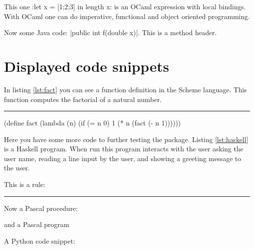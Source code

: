 \documentclass[10pt]{article}
\begin{document}

This one
\pyginline[lang=ocaml,font=\ttfamily\scriptsize,topline=false]:let x = [1;2;3] in length x:
is an OCaml expression with local bindings. With OCaml one can do
imperative, functional and object oriented programming.

Now some Java code:
\pyginline[lang=java,style=colorful,font=\ttfamily\itshape,linewidth=1pt]|public int f(double x)|.
This is a method header.

\section{Displayed code snippets}


In listing \ref{lst:fact} you can see a function definition in the
Scheme language. This function computes the factorial of a natural
number.  \newline\rule{\linewidth}{2pt}
\begin{pygmented}[
  style=emacs,
  rightline=false,
  linenos,
  label=lst:fact,
  caption=A \textbf{Scheme} function.
  ]
(define fact
    (lambda (n)
        (if (= n 0)
            1
            (* n (fact (- n 1))))))
\end{pygmented}

Here you have some more code to further testing the package. Listing
\ref{lst:haskell} is a Haskell program. When run this program interacts
with the user asking the user name, reading a line input by the user,
and showing a greeting message to the user.


This is a rule:

\noindent\rule{\linewidth}{2pt}

Now a Pascal procedure:

and a Pascal program

A Python code snippet:
\end{document}
